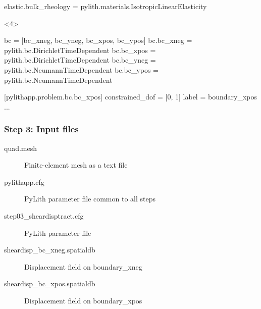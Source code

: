 \documentclass[aspectratio=169]{beamer}
\begin{document}
\begin{frame}[t,fragile]
\begin{minipage}[t]{0.60\textwidth}
\begin{onlyenv}
\begin{cfgcode}
        elastic.bulk_rheology = pylith.materials.IsotropicLinearElasticity
      \end{cfgcode}
    \end{onlyenv}
    \begin{onlyenv}<4>
      \begin{cfgcode}
        bc = [bc_xneg, bc_yneg, bc_xpos, bc_ypos]
        bc.bc_xneg = pylith.bc.DirichletTimeDependent
        bc.bc_xpos = pylith.bc.DirichletTimeDependent
        bc.bc_yneg = pylith.bc.NeumannTimeDependent
        bc.bc_ypos = pylith.bc.NeumannTimeDependent
        
        [pylithapp.problem.bc.bc_xpos]
        constrained_dof = [0, 1]
        label = boundary_xpos
        ...
      \end{cfgcode}
    \end{onlyenv}
  \end{minipage}

    

  
\end{frame}


\begin{frame}
  \frametitle{Step 3: Input files}
  \summary{}

  \begin{description}
  \item[quad.mesh] Finite-element mesh as a text file
  \item[pylithapp.cfg] PyLith parameter file common to all steps
  \item[step03\_sheardisptract.cfg] PyLith parameter file
  \item[sheardisp\_bc\_xneg.spatialdb] Displacement field on boundary\_xneg
  \item[sheardisp\_bc\_xpos.spatialdb] Displacement field on boundary\_xpos
  \end{description}
    
\end{frame}
\end{document}
